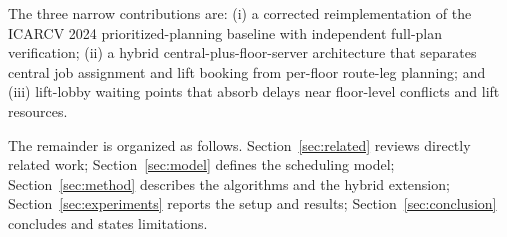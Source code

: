 The three narrow contributions are: (i) a corrected reimplementation of the ICARCV 2024 prioritized-planning baseline with independent full-plan verification; (ii) a hybrid central-plus-floor-server architecture that separates central job assignment and lift booking from per-floor route-leg planning; and (iii) lift-lobby waiting points that absorb delays near floor-level conflicts and lift resources.

The remainder is organized as follows. Section~\ref{sec:related} reviews directly related work; Section~\ref{sec:model} defines the scheduling model; Section~\ref{sec:method} describes the algorithms and the hybrid extension; Section~\ref{sec:experiments} reports the setup and results; Section~\ref{sec:conclusion} concludes and states limitations.
